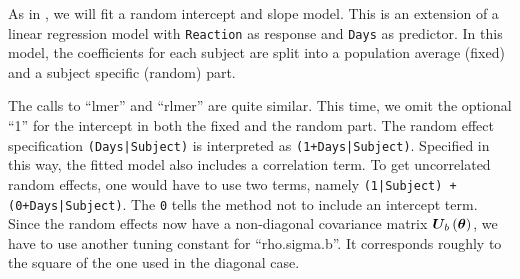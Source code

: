 \documentclass[11pt, a4paper]{article}
\newcommand{\T}[1]      {\texttt{#1}}
\newcommand{\fn}[1]{\kern-1pt\left(#1\right)\kern+0.5pt}
\newcommand{\bld}[1]{\boldsymbol{#1}}
\renewcommand{\vec}[1]{\bld{#1}}
\newcommand{\U}[2][-0.15ex]{\bld{U}_{\hspace{#1}#2\hspace{0.25ex}}}
\newcommand{\Ubth}{\U{b}\fn{\vec\theta}}
\theoremstyle{note}
\begin{document}
As in \citet{bates2011lme4}, we will fit a random intercept and slope
model. This is an extension of a linear regression model with \T{Reaction}
as response and \T{Days} as predictor. In this model, the coefficients for
each subject are split into a population average (fixed) and a subject
specific (random) part.

The calls to ``lmer'' and ``rlmer'' are quite similar. This time, we omit
the optional ``1'' for the intercept in both the fixed and the random
part. The random effect specification \T{(Days|Subject)} is interpreted as
\T{(1+Days|Subject)}. Specified in this way, the fitted model also
includes a correlation term. To get uncorrelated random effects, one would
have to use two terms, namely \T{(1|Subject) + (0+Days|Subject)}. The \T{0}
tells the method not to include an intercept term. Since the random effects
now have a non-diagonal covariance matrix $\Ubth$, we have to use another
tuning constant for ``rho.sigma.b''. It corresponds roughly to the square
of the one used in the diagonal case.
\end{document}
